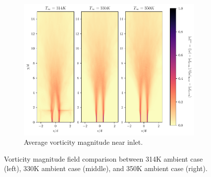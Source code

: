 \begin{figure}[H]
\begin{subfigure}{0.5\textwidth}
	\includegraphics[scale=.45]{figures/Plots/vertical/magvort_scaled_vert_avg_all_zoom.pdf}
	\caption{Average vorticity magnitude near inlet.} \label{all_magvort_3}
\end{subfigure}
\caption{Vorticity magnitude field comparison between 314K ambient case (left), 330K ambient case (middle), and 350K ambient case (right).}
\label{all_magvort_features}
\end{figure}

